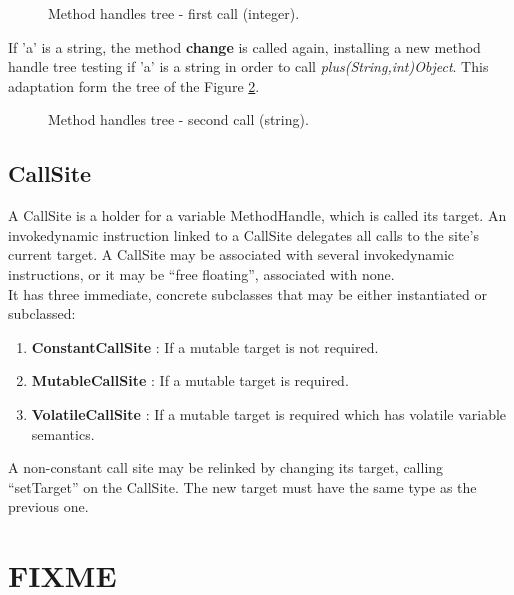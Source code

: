\documentclass{sig-alternate}
\begin{document}
      \begin{figure}[!h]
        \centering \resizebox{\linewidth}{!}{}
        \caption{Method handles tree - first call (integer).}
        \label{ast2}
      \end{figure}

      If 'a' is a string, the method {\bf change} is called again,
      installing a new method handle tree testing if 'a' is a string in order to call {\it plus(String,int)Object}.
      This adaptation form the tree of the Figure \ref{ast3}.

      \begin{figure}
        \centering \resizebox{.8\linewidth}{!}{}
        \caption{Method handles tree - second call (string).}
        \label{ast3}
      \end{figure}

    \subsection{CallSite}

      A CallSite is a holder for a variable MethodHandle, which is called its target.
      An invokedynamic instruction linked to a CallSite delegates all calls to the site's current target.
      A CallSite may be associated with several invokedynamic instructions,
      or it may be ``free floating'', associated with none.\\

      It has three immediate, concrete subclasses that may be either instantiated or subclassed:
      \begin{enumerate}
        \item \textbf{ConstantCallSite} : If a mutable target is not required.
        \item \textbf{MutableCallSite}  : If a mutable target is required.
        \item \textbf{VolatileCallSite} : If a mutable target is required which has volatile variable semantics.
      \end{enumerate}
      A non-constant call site may be relinked by changing its target, calling ``setTarget'' on the CallSite.
      The new target must have the same type as the previous one.

\section{FIXME}
\end{document}
